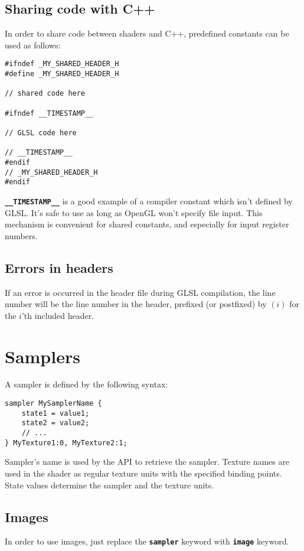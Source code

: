 \documentclass[11pt,a4paper,final,titlepage]{article}
\begin{document}
\subsection{Sharing code with C++}
In order to share code between shaders and C++, predefined constants can be used as follows:
\begin{lstlisting}
#ifndef _MY_SHARED_HEADER_H
#define _MY_SHARED_HEADER_H

// shared code here

#ifndef __TIMESTAMP__

// GLSL code here

// __TIMESTAMP__
#endif
// _MY_SHARED_HEADER_H
#endif
\end{lstlisting}

\texttt{\textbf{\_\_TIMESTAMP\_\_}} is a good example of a compiler constant which isn't defined by GLSL.
It's safe to use as long as OpenGL won't specify file input.
This mechanism is convenient for shared constants, and especially for input register numbers.

\subsection{Errors in headers}
If an error is occurred in the header file during GLSL compilation, the line number
will be the line number in the header, prefixed (or postfixed) by $(i)$ for the $i$'th
included header.

\pagebreak
\section{Samplers}\label{sec:samplers}

A sampler is defined by the following syntax:
\begin{lstlisting}
sampler MySamplerName {
	state1 = value1;
	state2 = value2;
	// ...
} MyTexture1:0, MyTexture2:1;
\end{lstlisting}
Sampler's name is used by the API to retrieve the sampler. Texture names are used in the shader
as regular texture units with the specified binding points.
State values determine the sampler and the texture units.

\subsection{Images}
In order to use images, just replace the \texttt{\textbf{sampler}} keyword with \texttt{\textbf{image}}
keyword.
\end{document}
